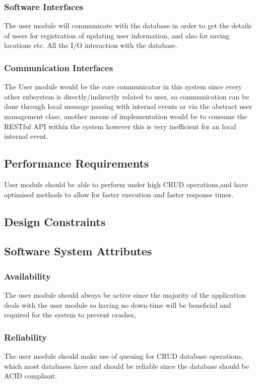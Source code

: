 	\subsubsection{Software Interfaces } 
	The user module will communicate with the database in order to get the details of users for registration of updating user information, and also for saving locations etc. All the I/O interaction with the database.
	\subsubsection{Communication Interfaces } 

	The User module would be the core communicator in this system since every other subsystem is directly/indirectly related to user, so communication can be done through local message passing with internal events or via the abstract user management class, another means of implementation would be to consume the RESTful API within the system however this is very inefficient for an local internal event.


	
\subsection{Performance Requirements} %
User module should be able to perform under high CRUD operations,and have optimised methods to allow for faster execution and faster response times.


\subsection{Design Constraints}



\subsection{Software System Attributes} %
\subsubsection{Availability}
The user module should always be active since the majority of the application deals with the user module so having no down-time will be beneficial and required for the system to prevent crashes,
\subsubsection{Reliability}
The user module should make use of queuing for CRUD database operations, which most databases have and should be reliable since the database should be ACID compliant.

